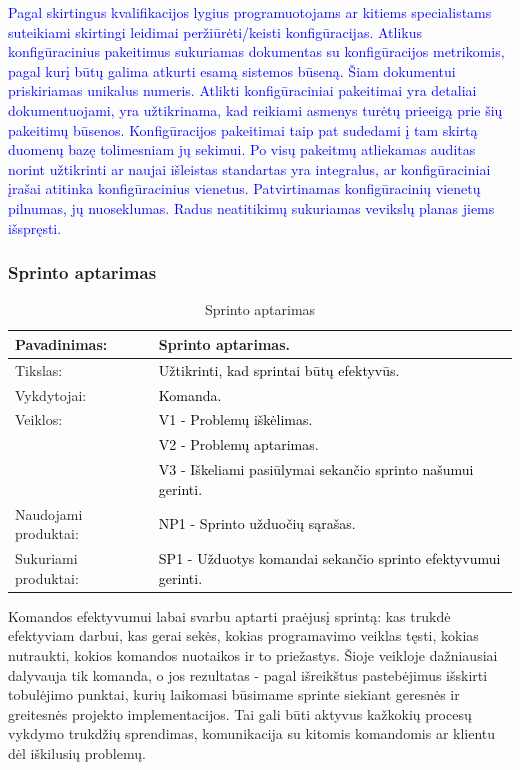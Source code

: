 \documentclass{VUMIFPSkursinis}
\begin{document}
		\textcolor{blue}{Pagal skirtingus kvalifikacijos lygius programuotojams ar kitiems specialistams suteikiami skirtingi leidimai peržiūrėti/keisti konfigūracijas. Atlikus konfigūracinius pakeitimus sukuriamas dokumentas su konfigūracijos metrikomis, pagal kurį būtų galima atkurti esamą sistemos būseną. Šiam dokumentui priskiriamas unikalus numeris.} \newline
		\textcolor{blue}{Atlikti konfigūraciniai pakeitimai yra detaliai dokumentuojami, yra užtikrinama, kad reikiami asmenys turėtų prieeigą prie šių pakeitimų būsenos.} \newline
		\textcolor{blue}{Konfigūracijos pakeitimai taip pat sudedami į tam skirtą duomenų bazę tolimesniam jų sekimui.} \newline
		\textcolor{blue}{Po visų pakeitmų atliekamas auditas norint užtikrinti ar naujai išleistas standartas yra integralus, ar konfigūraciniai įrašai atitinka konfigūracinius vienetus. Patvirtinamas konfigūracinių vienetų pilnumas, jų nuoseklumas. Radus neatitikimų sukuriamas vevikslų planas jiems išspręsti.}
	\subsubsection{Sprinto aptarimas}
	\begin{center}
		\begin{table}[ht]
			\caption{Sprinto aptarimas}
			\begin{tabular}{ | l | l | }
				\hline
				Pavadinimas:         & Sprinto aptarimas.							\\ \hline
				Tikslas:             & \textcolor{black}{Užtikrinti, kad sprintai būtų efektyvūs.}				\\ \hline
				Vykdytojai:          & \textcolor{black}{ Komanda.}								\\ \hline
				Veiklos:             & \textcolor{black}{ V1 - Problemų iškėlimas.}						\\
				                     & \textcolor{black}{V2 - Problemų aptarimas.}						\\
				                     & \textcolor{black}{V3 - Iškeliami pasiūlymai sekančio sprinto našumui gerinti.}		\\ \hline
				Naudojami produktai: & \textcolor{black}{NP1 - Sprinto užduočių sąrašas. 	}				\\ \hline
				Sukuriami produktai: & \textcolor{black}{SP1 - Užduotys komandai sekančio sprinto efektyvumui gerinti.}	\\ \hline
			\end{tabular}
		\end{table}
	\end{center}
	Komandos efektyvumui labai svarbu aptarti praėjusį sprintą: kas trukdė efektyviam darbui, kas gerai sekės, kokias programavimo veiklas tęsti, kokias nutraukti, kokios komandos nuotaikos ir to priežastys.
	Šioje veikloje dažniausiai dalyvauja tik komanda, o jos rezultatas - pagal išreikštus pastebėjimus išskirti tobulėjimo punktai, kurių laikomasi būsimame sprinte siekiant geresnės ir greitesnės projekto implementacijos.
	Tai gali būti aktyvus kažkokių procesų vykdymo trukdžių sprendimas, komunikacija su kitomis komandomis ar klientu dėl iškilusių problemų.
\end{document}
